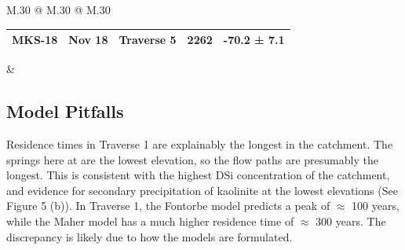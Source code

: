 \begin{landscape}
\begin{table}
\begin{tabular}{M{.30\textwidth} @{\hspace{4cm}} M{.30\textwidth} @{\hspace{4cm}} M{.30\textwidth}}
\begin{tabular}{l l l l l}
    MKS-18 & Nov 18 & Traverse 5 & 2262 & -70.2 ±  7.1 \\
    \hline
    \end{tabular}
    &
    \\ %
    \end{tabular}
\end{table}
\end{landscape}

   \newpage



\subsection{Model Pitfalls}

Residence times in Traverse 1 are explainably the longest in the catchment. The springs here at are the lowest elevation, so the flow paths are presumably the longest. This is consistent with the highest DSi concentration of the catchment, and evidence for secondary precipitation of kaolinite at the lowest elevations (See Figure 5 (b)). In Traverse 1, the Fontorbe model predicts a peak of $\approx$ 100 years, while the Maher model has a much higher residence time of $\approx$ 300 years. The discrepancy is likely due to how the models are formulated.

